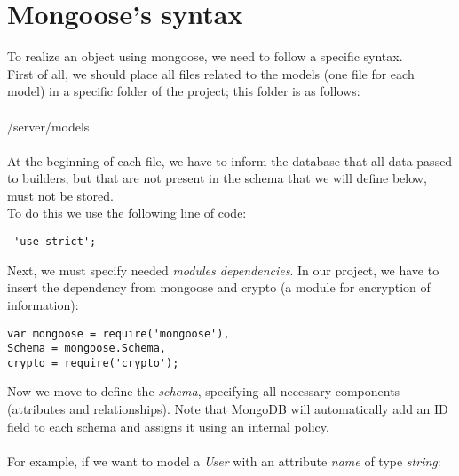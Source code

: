 \section{Mongoose's syntax}
To realize an object using mongoose, we need to follow a specific syntax.
\\First of all, we should place all files related to the models (one file for each model) in a specific folder of the project; this folder is as follows:
\\
\\/server/models
\\
\\At the beginning of each file, we have to inform the database that all data passed to builders, but that are not present in the schema that we will define below, must not be stored.
\\To do this we use the following line of code:


                \begin{lstlisting}
 'use strict';
                \end{lstlisting}
        

Next, we must specify needed \emph{modules dependencies}. In our project, we have to insert the dependency from mongoose and crypto (a module for encryption of information):


                \begin{lstlisting}      
var mongoose = require('mongoose'),
Schema = mongoose.Schema,
crypto = require('crypto');
                \end{lstlisting}
        

Now we move to define the \emph{schema}, specifying all necessary components (attributes and relationships). Note that MongoDB will automatically add an ID field to each schema and assigns it using an internal policy.
\\
\\For example, if we want to model a \emph{User} with an attribute \emph{name} of type \emph{string}:

\newpage

